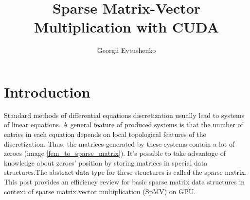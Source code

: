 \documentclass{article}
\begin{document}
\title{Sparse Matrix-Vector Multiplication with CUDA}
\author{Georgii Evtushenko}

\maketitle

\section{Introduction}

Standard methods of differential equations discretization usually lead to systems of linear equations. 
A general feature of produced systems is that the number of entries in each equation depends on local topological features of the discretization.
Thus, the matrices generated by these systems contain a lot of zeroes (image \ref{fem_to_sparse_matrix}). It's possible to take advantage of knowledge about zeroes' position by 
storing matrices in special data structures.The abstract data type for these structures is called the sparse matrix. 
This post provides an efficiency review for basic sparse matrix data structures in context of sparse matrix vector multiplication (SpMV) on GPU.
\end{document}
